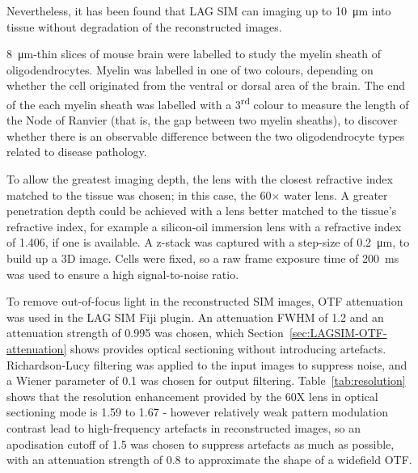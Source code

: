 Nevertheless, it has been found that LAG SIM can imaging up to \SI{10}{\micro\metre} into tissue without degradation of the reconstructed images. 

\SI{8}{\micro\metre}-thin slices of mouse brain were labelled to study the myelin sheath of oligodendrocytes. 
Myelin was labelled in one of two colours, depending on whether the cell originated from the ventral or dorsal area of the brain. 
The end of the each myelin sheath was labelled with a 3\textsuperscript{rd} colour to measure the length of the Node of Ranvier (that is, the gap between two myelin sheaths), to discover whether there is an observable difference between the two oligodendrocyte types related to disease pathology. 

To allow the greatest imaging depth, the lens with the closest refractive index matched to the tissue was chosen; in this case, the 60$\times$ water lens. 
A greater penetration depth could be achieved with a lens better matched to the tissue's refractive index, for example a silicon-oil immersion lens with a refractive index of \num{1.406}, if one is available. 
A z-stack was captured with a step-size of \SI{0.2}{\micro\metre}, to build up a 3D image. 
Cells were fixed, so a raw frame exposure time of \SI{200}{\milli\second} was used to ensure a high signal-to-noise ratio. 

To remove out-of-focus light in the reconstructed SIM images, OTF attenuation was used in the LAG SIM Fiji plugin. 
An attenuation FWHM of 1.2 and an attenuation strength of 0.995 was chosen, which Section~\ref{sec:LAGSIM-OTF-attenuation} shows provides optical sectioning without introducing artefacts. 
Richardson-Lucy filtering was applied to the input images to suppress noise, and a Wiener parameter of 0.1 was chosen for output filtering. 
Table~\ref{tab:resolution} shows that the resolution enhancement provided by the 60X lens in optical sectioning mode is 1.59 to 1.67 - however relatively weak pattern modulation contrast lead to high-frequency artefacts in reconstructed images, so an apodisation cutoff of 1.5 was chosen to suppress artefacts as much as possible, with an attenuation strength of 0.8 to approximate the shape of a widefield OTF. 


